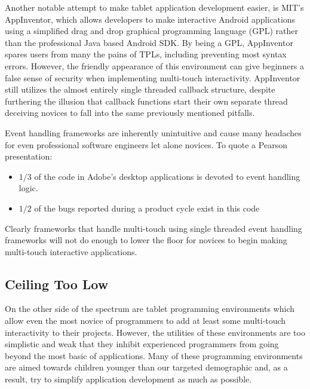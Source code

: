 Another notable attempt to make tablet application development easier, is MIT's AppInventor, which allows developers to make interactive Android applications using a simplified drag and drop graphical programming language (GPL) rather than the professional Java based Android SDK. By being a GPL, AppInventor spares users from many the pains of TPLs, including preventing most syntax errors. However, the friendly appearance of this environment can give beginners a false sense of security when implementing multi-touch interactivity. AppInventor still utilizes the almost entirely single threaded callback structure, despite furthering the illusion that callback functions start their own separate thread deceiving novices to fall into the same previously mentioned pitfalls.

Event handling frameworks are inherently unintuitive and cause many headaches for even professional software engineers let alone novices. To quote a Pearson presentation:

\begin{itemize}
\item $1/3$ of the code in Adobe’s desktop applications is devoted to event handling logic.
\item $1/2$ of the bugs reported during a product cycle exist in this code
\end{itemize}

Clearly frameworks that handle multi-touch using single threaded event handling frameworks will not do enough to lower the floor for novices to begin making multi-touch interactive applications.

\subsection{Ceiling Too Low}
On the other side of the spectrum are tablet programming environments which allow even the most novice of programmers to add at least some multi-touch interactivity to their projects. However, the utilities of these environments are too simplistic and weak that they inhibit experienced programmers from going beyond the most basic of applications. Many of these programming environments are aimed towards children younger than our targeted demographic and, as a result, try to simplify application development as much as possible. 


